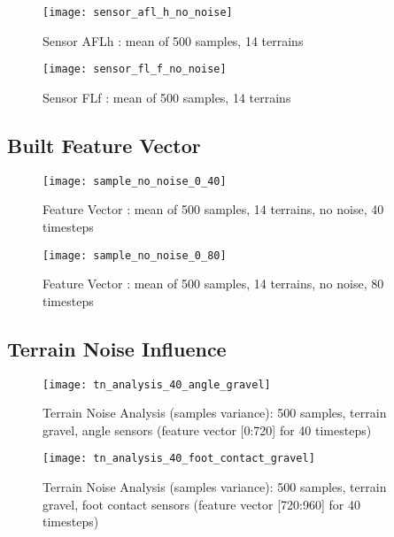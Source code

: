 \begin{figure}[H]
  \centering
  \texttt{[image: sensor\_afl\_h\_no\_noise]}
  \caption{Sensor AFLh : mean of 500 samples, 14 terrains}
  \label{fig:sensor_afl_h_no_noise}
\end{figure}

\begin{figure}[H]
  \centering
  \texttt{[image: sensor\_fl\_f\_no\_noise]}
  \caption{Sensor FLf : mean of 500 samples, 14 terrains}
  \label{fig:sensor_fl_f_no_noise}
\end{figure}

\subsection{Built Feature Vector} \label{ssec:built_feature_vectors}

\begin{figure}[H]
  \centering
  \texttt{[image: sample\_no\_noise\_0\_40]}
  \caption{Feature Vector : mean of 500 samples, 14 terrains, no noise, 40 timesteps}
  \label{fig:sample_40t}
\end{figure}


\begin{figure}[H]
  \centering
  \texttt{[image: sample\_no\_noise\_0\_80]}
  \caption{Feature Vector : mean of 500 samples, 14 terrains, no noise, 80 timesteps}
  \label{fig:sample_80t}
\end{figure}

\subsection{Terrain Noise Influence} \label{ssec:terrain_noise_influence}

\begin{figure}[H]
  \centering
  \texttt{[image: tn\_analysis\_40\_angle\_gravel]}
  \caption{Terrain Noise Analysis (samples variance): 500 samples, terrain gravel, angle sensors (feature vector [0:720] for 40 timesteps)}
  \label{fig:tn_analysis_angle_gravel}
\end{figure}

\begin{figure}[H]
  \centering
  \texttt{[image: tn\_analysis\_40\_foot\_contact\_gravel]}
  \caption{Terrain Noise Analysis (samples variance): 500 samples, terrain gravel, foot contact sensors (feature vector [720:960] for 40 timesteps)}
  \label{fig:tn_analysis_foot_contact_gravel}
\end{figure}

